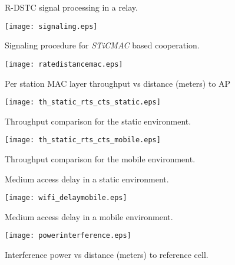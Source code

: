 \documentclass[peerreview,draftcls,onecolumn,12pt,a4paper]{IEEEtran}
\begin{document}



\pagebreak



\begin{figure}
    \caption{R-DSTC signal processing in a relay.}
    \label{fig:rdstc_block} \vspace{4in}
\end{figure}

\begin{figure}
\centering
   \texttt{[image: signaling.eps]}
\caption{\label{fig:RDSTCsignaling} Signaling procedure for
\emph{STiCMAC} based cooperation.}
\end{figure}



\begin{figure}[h!]
\centering
\texttt{[image: ratedistancemac.eps]}
\caption{Per station MAC layer throughput vs distance (meters) to
AP}
 \label{fig:macratevsdistance}
\end{figure}

\begin{figure}[h!]
\centering
   \texttt{[image: th\_static\_rts\_cts\_static.eps]}
\caption{Throughput comparison for the static environment.}
\label{fig:staticth}
\end{figure}

\pagebreak

\begin{figure}[h!]
    \centering
    \texttt{[image: th\_static\_rts\_cts\_mobile.eps]}
    \caption{Throughput comparison for the mobile environment.}
    \label{fig:mobileth}
\end{figure}


\begin{figure}[h!]
    \caption{Medium access delay in a static environment.}
    \label{fig:delaystatic}
\end{figure}

\begin{figure}[h!]
\centering
   \texttt{[image: wifi\_delaymobile.eps]}
\caption{\label{fig:delaymobile} Medium access delay in a mobile
environment.}
\end{figure}


\begin{figure}[h!]
\centering
   \texttt{[image: powerinterference.eps]}
\caption{\label{fig:powerinterference} Interference power vs
distance (meters) to reference cell.}
\end{figure}
\end{document}
